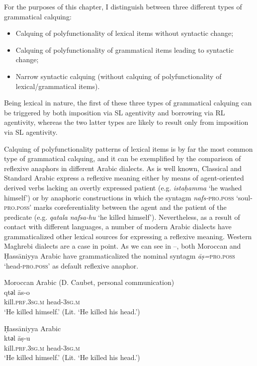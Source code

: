 \documentclass[output=paper]{langsci/langscibook}
\begin{document}
For the purposes of this chapter, I distinguish between three different types of grammatical calquing: 

\begin{itemize} 
\item Calquing of polyfunctionality of lexical items without syntactic change;
\item Calquing of polyfunctionality of grammatical items leading to syntactic change; 
\item Narrow syntactic calquing (without calquing of polyfunctionality of lexical/grammatical items).
\end{itemize}

Being lexical in nature, the first of these three types of grammatical calquing can be triggered by both imposition via SL agentivity and borrowing via RL agentivity, whereas the two latter types are likely to result only from imposition via SL agentivity. 

Calquing of polyfunctionality patterns of lexical items is by far the most common type of grammatical calquing, and it can be exemplified by the comparison of reflexive anaphors in different Arabic dialects. As is well known, Classical and Standard Arabic express a reflexive meaning either by means of agent-oriented derived verbs lacking an overtly expressed patient (e.g. \textit{istaḥamma} ‘he washed himself’) or by anaphoric constructions in which the syntagm \textit{nafs-}\textsc{pro.poss} ‘soul-\textsc{pro.poss’} marks coreferentiality between the agent and the patient of the predicate (e.g. \textit{qatala} \textit{nafsa-hu} ‘he killed himself’). Nevertheless, as a result of contact with different languages, a number of modern Arabic dialects have grammaticalized other lexical sources for expressing a reflexive meaning. Western Maghrebi dialects are a case in point. As we can see in --, both Moroccan and Ḥassāniyya Arabic have grammaticalized the nominal syntagm \textit{{\R}āṣ=}\textsc{pro.poss} ‘head-\textsc{pro.poss’} as default reflexive anaphor.

\ea\label{ex:key:15}
{Moroccan Arabic (D. Caubet, personal communication)} \\
\gll   qtәl {\R}ās-o\\
       kill.\textsc{prf.3sg.m} head-\textsc{3sg.m}\\
\glt   `He killed himself.' (Lit. ‘He killed his head.’)
\z

\ea\label{ex:key:16}
{Ḥassāniyya Arabic \citep[16]{Taine-Cheikh2008chapter}}\\
\gll   ktәl {\R}āṣ-u\\
       kill.\textsc{prf.3sg.m} head-\textsc{3sg.m}\\
\glt   `He killed himself.' (Lit. ‘He killed his head.’)
\z
\end{document}
